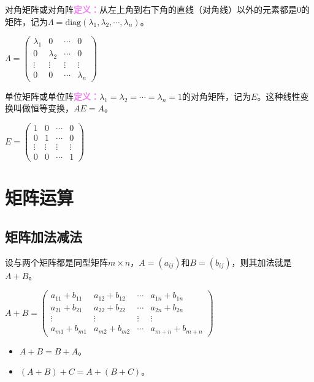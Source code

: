 \documentclass[UTF8, 12pt]{ctexart}
\begin{document}
\begin{multicols}{2}


对角矩阵或对角阵\textcolor{violet}{\textbf{定义：}}从左上角到右下角的直线（对角线）以外的元素都是0的矩阵，记为$\varLambda=\textrm{diag}(\lambda_1,\lambda_2,\cdots,\lambda_n)$。

$\varLambda=\left(
\begin{array}{cccc}
\lambda_1 & 0 & \cdots & 0 \\
0 & \lambda_2 & \cdots & 0 \\
\vdots & \vdots & \vdots & \vdots \\
0 & 0 & \cdots & \lambda_n
\end{array}
\right)$

单位矩阵或单位阵\textcolor{violet}{\textbf{定义：}}$\lambda_1=\lambda_2=\cdots=\lambda_n=1$的对角矩阵，记为$E$。这种线性变换叫做恒等变换，$AE=A$。 \medskip

$E=\left(
\begin{array}{cccc}
1 & 0 & \cdots & 0 \\
0 & 1 & \cdots & 0 \\
\vdots & \vdots & \vdots & \vdots \\
0 & 0 & \cdots & 1
\end{array}
\right)$

\end{multicols}

\section{矩阵运算}

\subsection{矩阵加法减法}

设与两个矩阵都是同型矩阵$m\times n$，$A=(a_{ij})$和$B=(b_{ij})$，则其加法就是$A+B$。

$A+B=\left(
\begin{array}{cccc}
a_{11}+b_{11} & a_{12}+b_{12} & \cdots & a_{1n}+b_{1n} \\
a_{21}+b_{21} & a_{22}+b_{22} & \cdots & a_{2n}+b_{2n} \\
\vdots & \vdots & \vdots & \vdots \\
a_{m1}+b_{m1} & a_{m2}+b_{m2} & \cdots & a_{m+n}+b_{m+n}
\end{array}
\right)$

\begin{itemize}
\item $A+B=B+A$。
\item $(A+B)+C=A+(B+C)$。
\end{itemize}
\end{document}
